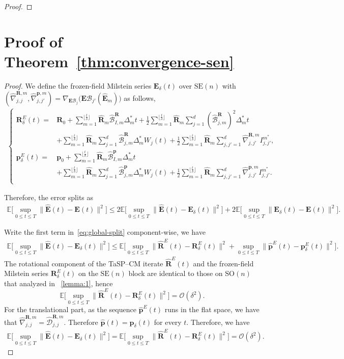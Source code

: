 \documentclass[11pt, a4paper, onecolumn]{article}
\newcommand{\SOn}{\mathrm{SO}(n)}
\newcommand{\SEn}{\mathrm{SE}(n)}
\newcommand{\E}{\mathbb{E}}
\newcommand{\bfE}{\bf{E}}
\newcommand{\m}{m}
\newcommand{\bfR}{\mathbf{R}}
\newcommand{\B}{\mathcal{B}}
\newcommand{\hatB}{\widehat{\B}}
\newcommand{\hatR}{\widehat{\bfR}}
\newcommand{\hatE}{\widehat{\bf E}}
\newcommand{\hatD}{\widehat{\tg D}}
\newcommand{\hatp}{\widehat{\bf p}}
\renewcommand{\bf}[1]{\mathbf{#1}}
\newcommand{\tg}[1]{\mathcal{#1}}
\newcommand{\calO}{\mathcal{O}}
\newcommand{\ms}{{m^*}}
\newcommand{\Dms}{{\Delta^{*}_{m}}}
\newcommand{\hBIRms}{{\hatB^{\bfR}_{I,\m}}}
\newcommand{\hBjRms}{{\hatB^{\bfR}_{j,\m}}}
\newcommand{\hDjjRms}{ {\hatD_{j,j}^{\bfR,\m}} }
\newcommand{\hnjjRms}{ {\widehat{\nabla}_{j,j}^{\bfR,\m}} }
\newcommand{\hnjjpRms}{ {\widehat{\nabla}_{j,j'}^{\bfR,\m}} }
\newcommand{\hBIPms}{{\hatB^{\bf p}_{I,\m}}}
\newcommand{\hBjPms}{{\hatB^{\bf p}_{j,\m}}}
\newcommand{\hnjjpPms}{ {\widehat{\nabla}_{j,j'}^{\bf p,\m}} }
\newcommand{\Ijjpms}{ {I_{j,j'}^{\ms}} }
\newcommand{\sumub}{{\lfloor \frac{t}{\delta} \rfloor}}
\newcommand{\half}{{\frac{1}{2}}}
\newcommand{\hRms}{{\hatR_\m}}
\newcommand{\Der}[4]{
  #1_{#2}\bigl(#3(#4)\bigr)
}
\begin{document}
\begin{appendices}
\begin{proof}
\end{proof}

\section{Proof of Theorem~\ref{thm:convergence-sen}}\label{app:conv-sen} 
\begin{proof}
We define the frozen-field Milstein series $\bfE_{\delta}(t)$ over $\SEn$ with $(\hnjjRms,\hnjjpPms) =\Der{\nabla}{\bf E \B_j}{\bf E \B_{j'}}{\hatE_m}$ as follows,
\begin{align*}
    \begin{cases}
          \bfR^E_\delta(t) = & \bfR_0 + \sum_{m=1}^{\sumub} \hRms \hBIRms \Dms t +  \half \sum_{m=1}^{\sumub}  \hRms\sum_{j=1}^d (\hBjRms)^2 \Dms t  \\ 
            & + \sum_{m=1}^{\sumub}\hRms\sum_{j=1}^d \hBjRms \Dms W_j(t)  + \half\sum_{m=1}^{\sumub}\hRms\sum_{j,j'=1}^d \hnjjpRms \Ijjpms, \\
          {\bf p}^E_{\delta}(t) = & \bf p_0 + \sum_{m=1}^{\sumub} \hRms \hBIPms \Dms t \\ 
            & + \sum_{m=1}^{\sumub}\hRms\sum_{j=1}^d \hBjPms \Dms W_j(t) + \half\sum_{m=1}^{\sumub}\hRms\sum_{j,j'=1}^d \hnjjpPms \Ijjpms. \\
    \end{cases}
\end{align*}

Therefore, the error splits as
\begin{align}\label{eq:global-split}
    \E\bigl[\sup_{0\le t\le T}\|\hatE(t)-\bfE(t)\|^2\bigr]
    \le 
    2\E\bigl[\sup_{0\le t\le T}\|\hatE(t)-\bfE_\delta(t)\|^2\bigr]
    +
    2\E\bigl[\sup_{0\le t\le T}\|\bfE_\delta(t)-\bfE(t)\|^2\bigr].
\end{align}

Write the first term in~\eqref{eq:global-split} component-wise, we have
\begin{align*}
    \E\bigl[\sup_{0\le t\le T}\|\hatE(t)-\bfE_\delta(t)\|^2\bigr]
    \le 
    \E\bigl[\sup_{0\le t\le T}\|\hatR^E(t)-\bfR^E_\delta(t)\|^2+\sup_{0\le t\le T}\|\hatp^E(t)-\bf p^E_\delta(t)\|^2\bigr].
\end{align*}
The rotational component of the TaSP–CM iterate $\hatR^E(t)$ and the frozen-field Milstein series $\bfR^E_\delta(t)$ on the $\SEn$ block are identical to those on $\SOn$ that analyzed in ~\cref{lemma:1}, hence
\[
\E\bigl[\sup_{0\le t\le T}\|\hatR^E(t)-\bfR^E_\delta(t)\|^2\bigr]=\calO(\delta^{2}).
\]
For the translational part, as the sequence $\hatp^E(t)$ runs in the flat space, we have that $\hnjjRms = \hDjjRms$. Therefore
$
\hatp(t)=\bf p_\delta(t)
$
for every $t$. Therefore, we have
\begin{align}\label{eq:num-vs-mil}
    \E\bigl[\sup_{0\le t\le T}\|\hatE(t)-\bfE_\delta(t)\|^2\bigr]=\E\bigl[\sup_{0\le t\le T}\|\hatR^E(t)-\bfR^E_\delta(t)\|^2\bigr] =\calO(\delta^{2}).
\end{align}


\end{proof}
\end{appendices}
\end{document}
